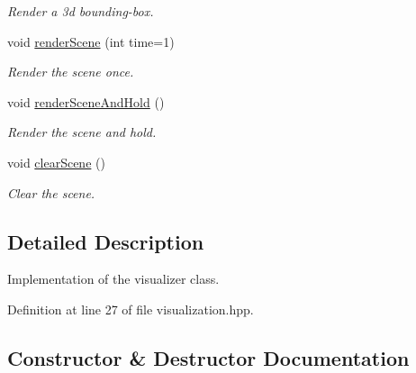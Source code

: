 \begin{DoxyCompactItemize}
\begin{DoxyCompactList}\small\item\em Render a 3d bounding-\/box. \end{DoxyCompactList}\item 
void \hyperlink{classtapl_1_1viz_1_1Visualizer_a8ec08b4e37523fb75731b58748224035}{render\+Scene} (int time=1)
\begin{DoxyCompactList}\small\item\em Render the scene once. \end{DoxyCompactList}\item 
void \hyperlink{classtapl_1_1viz_1_1Visualizer_aed14efd9e578a4b6013b9745e07acea1}{render\+Scene\+And\+Hold} ()
\begin{DoxyCompactList}\small\item\em Render the scene and hold. \end{DoxyCompactList}\item 
void \hyperlink{classtapl_1_1viz_1_1Visualizer_a912479d651c5a9bcd5a24b77025f10c0}{clear\+Scene} ()
\begin{DoxyCompactList}\small\item\em Clear the scene. \end{DoxyCompactList}\end{DoxyCompactItemize}


\subsection{Detailed Description}
Implementation of the visualizer class. 

Definition at line 27 of file visualization.\+hpp.



\subsection{Constructor \& Destructor Documentation}
